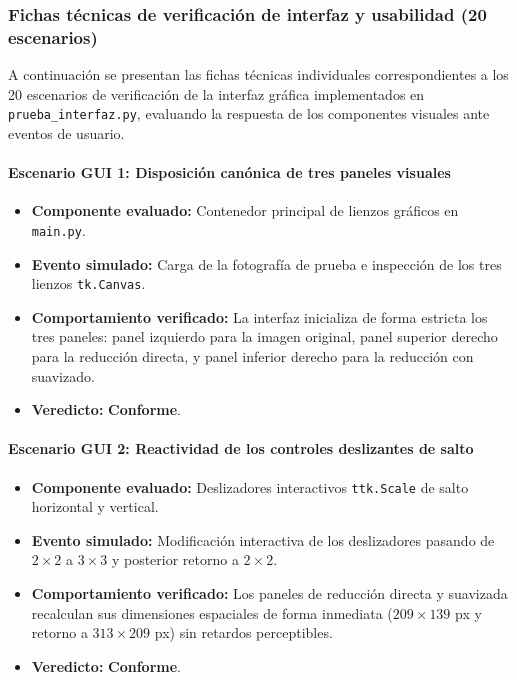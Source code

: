 \documentclass[11pt]{article}
\newcommand{\pruebaok}{\textcolor{verdeExito}{\textbf{Conforme}}}
\begin{document}
\subsubsection{Fichas técnicas de verificación de interfaz y usabilidad (20 escenarios)}

A continuación se presentan las fichas técnicas individuales correspondientes a los 20 escenarios de verificación de la interfaz gráfica implementados en \texttt{prueba\_interfaz.py}, evaluando la respuesta de los componentes visuales ante eventos de usuario.

\paragraph{Escenario GUI 1: Disposición canónica de tres paneles visuales}
\begin{itemize}[itemsep=0.15em]
\item \textbf{Componente evaluado:} Contenedor principal de lienzos gráficos en \texttt{main.py}.
\item \textbf{Evento simulado:} Carga de la fotografía de prueba e inspección de los tres lienzos \texttt{tk.Canvas}.
\item \textbf{Comportamiento verificado:} La interfaz inicializa de forma estricta los tres paneles: panel izquierdo para la imagen original, panel superior derecho para la reducción directa, y panel inferior derecho para la reducción con suavizado.
\item \textbf{Veredicto:} \pruebaok.
\end{itemize}

\paragraph{Escenario GUI 2: Reactividad de los controles deslizantes de salto}
\begin{itemize}[itemsep=0.15em]
\item \textbf{Componente evaluado:} Deslizadores interactivos \texttt{ttk.Scale} de salto horizontal y vertical.
\item \textbf{Evento simulado:} Modificación interactiva de los deslizadores pasando de $2\times2$ a $3\times3$ y posterior retorno a $2\times2$.
\item \textbf{Comportamiento verificado:} Los paneles de reducción directa y suavizada recalculan sus dimensiones espaciales de forma inmediata ($209 \times 139$ px y retorno a $313 \times 209$ px) sin retardos perceptibles.
\item \textbf{Veredicto:} \pruebaok.
\end{itemize}
\end{document}
